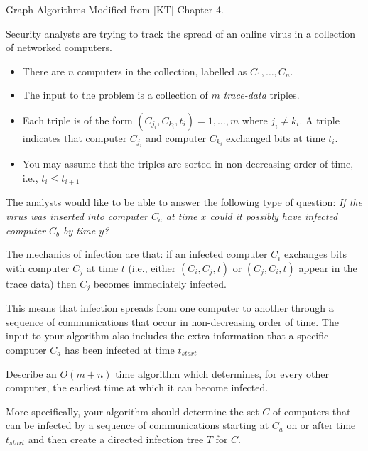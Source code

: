 \documentclass{article}
\numberwithin{table}{section}
\numberwithin{figure}{section}
\begin{document}
\newpage
\begin{section}{Graph Algorithms}
Modified from [KT] Chapter 4.

Security analysts are trying to track the spread of an online virus in a
collection of networked computers.

\begin{itemize}
    \item There are $n$ computers in the collection, labelled as $C_1, \dots, C_n$.
    \item The input to the problem is a collection of $m$ \textit{trace-data} triples.
    \item Each triple is of the form $(C_{j_i}, C_{k_i}, t_i) = 1, \dots, m$ where $j_i \neq k_i$. A triple indicates that computer $C_{j_i}$ and computer $C_{k_i}$ exchanged bits at time $t_i$.
    \item You may assume that the triples are sorted in non-decreasing order of time, i.e., $t_i \leq t_{i+1}$ 
\end{itemize}

The analysts would like to be able to answer the following type of question: \textit{If the virus was inserted into computer $C_a$ at time $x$ could it possibly have infected computer $C_b$ by time $y$?}

The mechanics of infection are that: if an infected computer $C_i$ exchanges bits with computer $C_j$ at time $t$ (i.e., either $(C_i, C_j, t)$ or $(C_j, C_i, t)$ appear in the trace data) then $C_j$ becomes immediately infected.

This means that infection spreads from one computer to another through a sequence of communications that occur in non-decreasing order of time. The input to your algorithm also includes the extra information that a specific computer $C_a$ has been infected at time $t_{start}$

Describe an $O(m + n)$ time algorithm which determines, for every other computer, the earliest time at which it can become infected.

More specifically, your algorithm should determine the set $C$ of computers that can be infected by a sequence of communications starting at $C_a$ on or after time $t_{start}$ and then create a directed infection tree $T$ for $C$.


\end{section}
\end{document}

